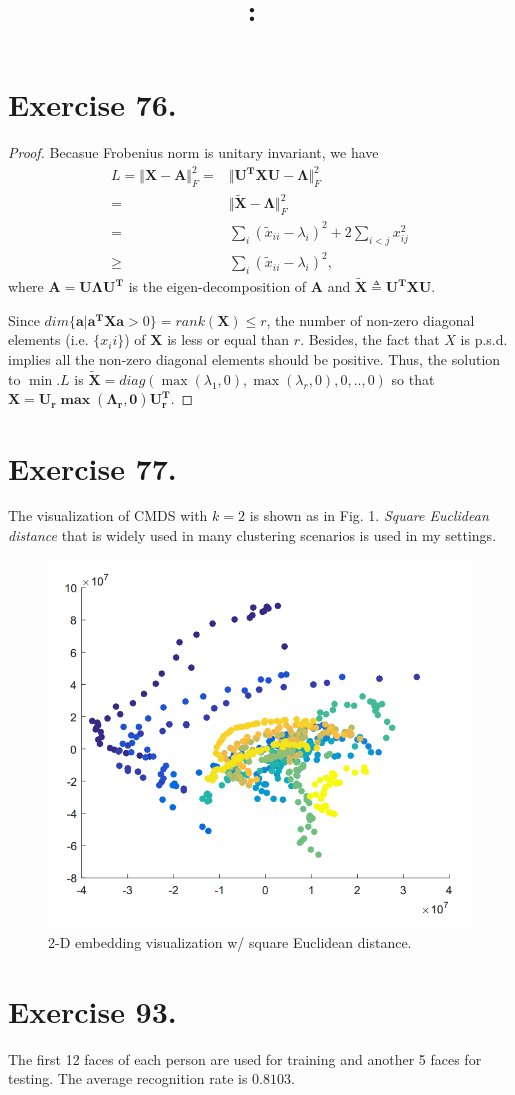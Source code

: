 \documentclass{article}
\date{}
\title{
    \textmd{\textbf{\hmwkClass:\ \hmwkTitle}}\\
}
\author{\hmwkAuthorName}
\begin{document}
\maketitle
\section{Exercise 76.}
\begin{proof}
Becasue Frobenius norm is unitary invariant, we have
\begin{align*}
    L = \Vert \mathbf{X} - \mathbf{A} \Vert_F^2 = &\Vert \mathbf{U^{T}XU} - \mathbf{\Lambda} \Vert_F^2 \\
    = &\Vert \mathbf{\tilde X} - \mathbf{\Lambda} \Vert_F^2 \\
    = &\sum_{i}(\tilde{x}_{ii}-\lambda_i)^2 + 2\sum_{i<j}x_{ij}^2\\
    \geq & \sum_{i}(\tilde{x}_{ii}-\lambda_i)^2,
\end{align*}
where $\mathbf{A = U\Lambda U^T}$ is the eigen-decomposition of $\mathbf A$ and $\tilde{\mathbf X}\textbf{} \triangleq \mathbf{U^{T}XU}$. 

Since $dim\{\mathbf{a} | \mathbf{a^TXa}>0\} = rank(\mathbf X) \leq r$, the number of non-zero diagonal elements (i.e. $\{x_ii\}$) of $\mathbf X$ is less or equal than $r$. Besides, the fact that $X$ is p.s.d. implies all the non-zero diagonal elements should be positive. Thus, the solution to $\min. L$ is $\mathbf{\tilde X} = diag(\max(\lambda_1,0),\max(\lambda_r,0),0,..,0)$ so that $\mathbf{X = U_r\max(\Lambda_r,0)U_r^T}$.
\end{proof}


\section{Exercise 77.}
The visualization of CMDS with $k =2$ is shown as in Fig. 1. \textit{Square Euclidean distance} that is widely used in many clustering scenarios is used in my settings.
\begin{figure}[htbp]
    \centering
    \includegraphics[scale = 0.25]{fig1}
    \caption{2-D embedding visualization w/ square Euclidean distance.}
\end{figure}

\section{Exercise 93.}
The first 12 faces of each person are used for training and another 5 faces for testing. The average recognition rate is $0.8103$. 
\end{document}
